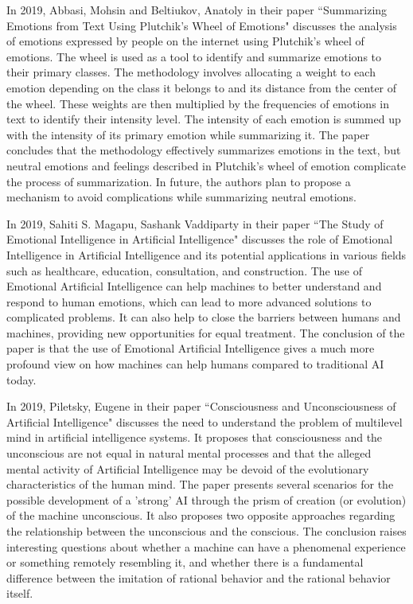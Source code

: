 In 2019, Abbasi, Mohsin and Beltiukov, Anatoly in their paper ``Summarizing Emotions from Text Using Plutchik's Wheel of Emotions" discusses the analysis of emotions expressed by people on the internet using Plutchik's wheel of emotions. The wheel is used as a tool to identify and summarize emotions to their primary classes. The methodology involves allocating a weight to each emotion depending on the class it belongs to and its distance from the center of the wheel. These weights are then multiplied by the frequencies of emotions in text to identify their intensity level. The intensity of each emotion is summed up with the intensity of its primary emotion while summarizing it. The paper concludes that the methodology effectively summarizes emotions in the text, but neutral emotions and feelings described in Plutchik's wheel of emotion complicate the process of summarization. In future, the authors plan to propose a mechanism to avoid complications while summarizing neutral emotions\cite{article3}.
\vspace{1\baselineskip}

In 2019, Sahiti S. Magapu, Sashank Vaddiparty in their paper ``The Study of Emotional Intelligence in
Artificial Intelligence" discusses the role of Emotional Intelligence in Artificial Intelligence and its potential applications in various fields such as healthcare, education, consultation, and construction. The use of Emotional Artificial Intelligence can help machines to better understand and respond to human emotions, which can lead to more advanced solutions to complicated problems. It can also help to close the barriers between humans and machines, providing new opportunities for equal treatment. The conclusion of the paper is that the use of Emotional Artificial Intelligence gives a much more profound view on how machines can help humans compared to traditional AI today\cite{ISSN-2456-2165}.
\vspace{1\baselineskip}

In 2019, Piletsky, Eugene in their paper ``Consciousness and Unconsciousness of Artificial Intelligence" discusses the need to understand the problem of multilevel mind in artificial intelligence systems. It proposes that consciousness and the unconscious are not equal in natural mental processes and that the alleged mental activity of Artificial Intelligence may be devoid of the evolutionary characteristics of the human mind. The paper presents several scenarios for the possible development of a 'strong' AI through the prism of creation (or evolution) of the machine unconscious. It also proposes two opposite approaches regarding the relationship between the unconscious and the conscious. The conclusion raises interesting questions about whether a machine can have a phenomenal experience or something remotely resembling it, and whether there is a fundamental difference between the imitation of rational behavior and the rational behavior itself\cite{article4}.
\vspace{1\baselineskip}


